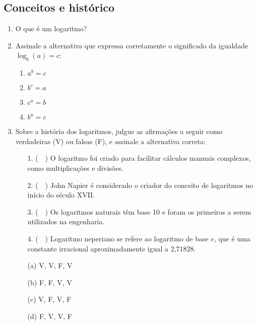 \documentclass[12pt,a4paper]{article}
\begin{document}
\subsection*{Conceitos e histórico}
\begin{enumerate}
  \item O que é um logaritmo?

  \item Assinale a alternativa que expressa corretamente o significado da igualdade $\log_b(a) = c$:
        \begin{enumerate}
          \item $a^b = c$
          \item $b^c = a$
          \item $c^a = b$
          \item $b^a = c$
        \end{enumerate}

  \item Sobre a história dos logaritmos, julgue as afirmações a seguir como verdadeiras (V) ou falsas (F),
        e assinale a alternativa correta:

        \sloppy\begin{enumerate}
          \item[1.] (~~) O logaritmo foi criado para facilitar cálculos manuais complexos,
                como multiplicações e divisões.
          \item[2.] (~~) John Napier é considerado o criador do conceito de logaritmos no início do século XVII.
          \item[3.] (~~) Os logaritmos naturais têm base 10 e foram os primeiros a serem utilizados na engenharia.
          \item[4.] (~~) Logaritmo neperiano se refere ao logaritmo de base \(e\), que é uma constante irracional aproximadamente igual a 2{,}71828.
        \end{enumerate}

        \begin{enumerate}
          \item[(a)] V, V, F, V
          \item[(b)] F, F, V, V
          \item[(c)] V, F, V, F
          \item[(d)] F, V, V, F
        \end{enumerate}

\end{enumerate}
\end{document}
